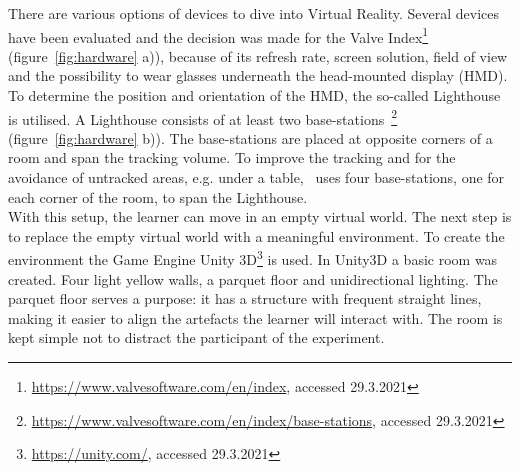 There are various options of devices to dive into Virtual Reality. Several devices have been evaluated and the decision was made for the Valve Index\footnote{\href{https://www.valvesoftware.com/en/index}{https://www.valvesoftware.com/en/index}, accessed 29.3.2021} (figure~\ref{fig:hardware} a)), because of its refresh rate, screen solution, field of view and the possibility to wear glasses underneath the head-mounted display (HMD). To determine the position and orientation of the HMD, the so-called Lighthouse is utilised. A Lighthouse consists of at least two base-stations~\footnote{\href{https://www.valvesoftware.com/en/index/base-stations}{https://www.valvesoftware.com/en/index/base-stations}, accessed 29.3.2021} (figure~\ref{fig:hardware} b)). The base-stations are placed at opposite corners of a room and span the tracking volume. To improve the tracking and for the avoidance of untracked areas, e.g. under a table, \exgo\ uses four base-stations, one for each corner of the room, to span the Lighthouse.\\
With this setup, the learner can move in an empty virtual world. The next step is to replace the empty virtual world with a meaningful environment. To create the environment the Game Engine Unity 3D\footnote{\href{https://unity.com/}{https://unity.com/}, accessed 29.3.2021} is used. In Unity3D a basic room was created. Four light yellow walls, a parquet floor and unidirectional lighting. The parquet floor serves a purpose: it has a structure with frequent straight lines, making it easier to align the artefacts the learner will interact with. The room is kept simple not to distract the participant of the experiment.\\
